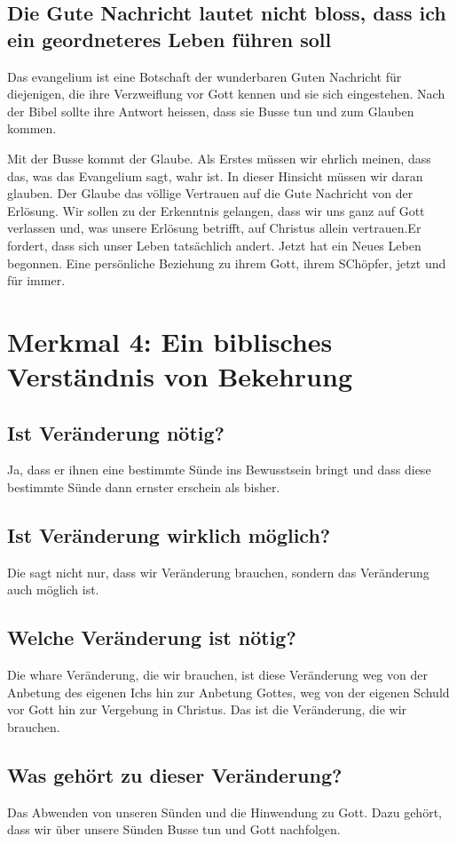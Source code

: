 \documentclass{../../inc/mybib}
\begin{document}
\subsection{Die Gute Nachricht lautet nicht bloss, dass ich ein geordneteres Leben führen soll}
Das evangelium ist eine Botschaft der wunderbaren Guten Nachricht für diejenigen, die ihre Verzweiflung vor Gott kennen und sie sich eingestehen. Nach der Bibel sollte ihre Antwort heissen, dass sie Busse tun und zum Glauben kommen.

Mit der Busse kommt der Glaube. Als Erstes müssen wir ehrlich meinen, dass das, was das Evangelium sagt, wahr ist. In dieser Hinsicht müssen wir daran glauben. Der Glaube das völlige Vertrauen auf die Gute Nachricht von der Erlösung. Wir sollen zu der Erkenntnis gelangen, dass wir uns ganz auf Gott verlassen und, was unsere Erlösung betrifft, auf Christus allein vertrauen.Er fordert, dass sich unser Leben tatsächlich andert. Jetzt hat ein Neues Leben begonnen. Eine persönliche Beziehung zu ihrem Gott, ihrem SChöpfer, jetzt und für immer.
\section{Merkmal 4: Ein biblisches Verständnis von Bekehrung}
\subsection{Ist Veränderung nötig?}
Ja, dass er ihnen eine bestimmte Sünde ins Bewusstsein bringt und dass diese bestimmte Sünde dann ernster erschein als bisher.
\subsection{Ist Veränderung wirklich möglich?}
Die sagt nicht nur, dass wir Veränderung brauchen, sondern das Veränderung auch möglich ist.
\subsection{Welche Veränderung ist nötig?}
Die whare Veränderung, die wir brauchen, ist diese Veränderung weg von der Anbetung des eigenen Ichs hin zur Anbetung Gottes, weg von der eigenen Schuld vor Gott hin zur Vergebung in Christus. Das ist die Veränderung, die wir brauchen.
\subsection{Was gehört zu dieser Veränderung?}
Das Abwenden von unseren Sünden und die Hinwendung zu Gott. Dazu gehört, dass wir über unsere Sünden Busse tun und Gott nachfolgen.
\end{document}
